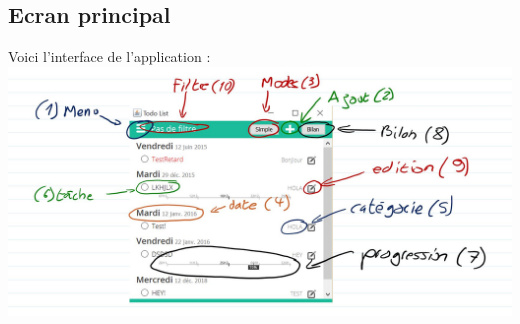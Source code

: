 \documentclass{article}
\begin{document}
	\subsection{Ecran principal}
		Voici l'interface de l'application :\\
		\includegraphics[width=14cm]{images/interface.jpg}
\end{document}
